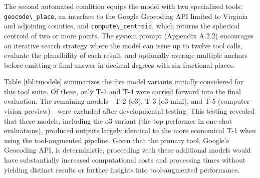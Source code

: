 The second automated condition equips the model with two specialized
tools: \passthrough{\lstinline!geocode\_place!}, an interface to the
Google Geocoding API limited to Virginia and adjoining counties, and
\passthrough{\lstinline!compute\_centroid!}, which returns the spherical
centroid of two or more points. The system prompt (Appendix A.2.2)
encourages an iterative search strategy where the model can issue up to
twelve tool calls, evaluate the plausibility of each result, and
optionally average multiple anchors before emitting a final answer in
decimal degrees with six fractional places.

Table \ref{tbl:tmodels} summarizes the five model variants initially
considered for this tool suite. Of these, only T-1 and T-4 were carried
forward into the final evaluation. The remaining models---T-2 (o3), T-3
(o3-mini), and T-5 (computer-vision preview)---were excluded after
developmental testing. This testing revealed that these models,
including the o3 variant (the top performer in one-shot evaluations),
produced outputs largely identical to the more economical T-1 when using
the tool-augmented pipeline. Given that the primary tool, Google's
Geocoding API, is deterministic, proceeding with these additional models
would have substantially increased computational costs and processing
times without yielding distinct results or further insights into
tool-augmented performance.

